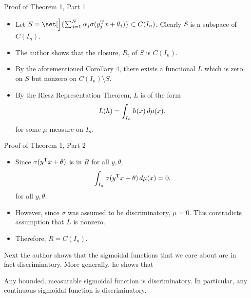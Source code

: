 \documentclass[11pt,letterpaper]{beamer}
\begin{document}
\begin{frame}{Proof of Theorem 1, Part 1}
  \begin{itemize}
  \item Let $S=\set[\Big]{\sum_{j=1}^N
      \alpha_j\sigma( y_j^\rmT x+\theta_j)}\subset C(I_n)$. Clearly $S$
    is a subspace of $C(I_n)$.
  \item The author shows that the closure, $R$, of $S$ is $C(I_n)$.
  \item By the aforementioned Corollary 4, there exists a functional $L$ which
    is zero on $S$ but nonzero on $C(I_n)\setminus S$.
  \item By the Riesz Representation Theorem, $L$ is of the form
    \[
      L(h)=\int_{I_n}h(x)\mathop{}\!d\mu(x),
    \]
    for some $\mu$ measure on $I_n$.
  \end{itemize}
\end{frame}

\begin{frame}{Proof of Theorem 1, Part 2}
  \begin{itemize}
  \item Since $\sigma( y^{\mathrm{T}} x+\theta)$ is in $R$ for all $ y,\theta$,
    \[
      \int_{I_n}\sigma( y^{\mathrm{T}} x+\theta)\mathop{}\!d\mu( x)=0,
    \]
    for all $ y,\theta$.
  \item However, since $\sigma$ was assumed to be discriminatory, $\mu=0$. This
    contradicts assumption that $L$ is nonzero.
  \item Therefore, $R=C(I_n)$.
  \end{itemize}
\end{frame}

\begin{frame}
  Next the author shows that the sigmoidal functions that we care about are in
  fact discriminatory. More generally, he shows that
  \begin{lemma}
    Any bounded, measurable sigmoidal function is discriminatory. In particular,
    any continuous sigmoidal function is discriminatory.
  \end{lemma}
\end{frame}
\end{document}
